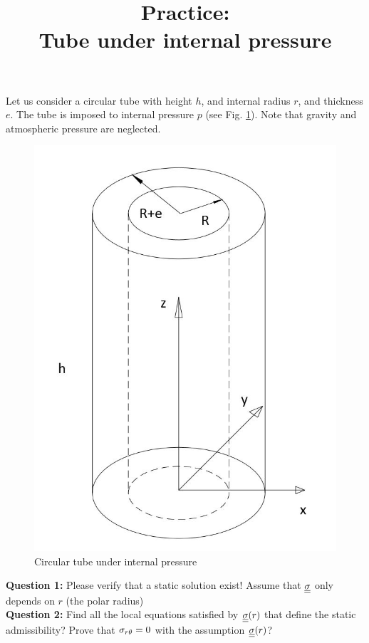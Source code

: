\documentclass[letter,12pt]{article}
\begin{document}
\pagestyle{fancy}

\title{\textbf{Practice: \\ Tube under internal pressure}}
\date{}

\maketitle

\vspace{-1cm}


Let us consider a circular tube with height $h$, and internal radius $r$, and thickness $e$. The tube is imposed to internal pressure $p$ (see Fig. \ref{fig:replacewithrealfigure}). Note that gravity and atmospheric pressure are neglected.

\begin{figure}[ht]
	\centering
	\includegraphics[width=0.5\linewidth]{figures/p1}
	\caption{Circular tube under internal pressure}
	\label{fig:replacewithrealfigure}
\end{figure}



\noindent \textbf{Question 1:} Please verify that a static solution exist! Assume that $\underline{\underline{\sigma}}$ only depends on $r$ (the polar radius)\\

\noindent \textbf{Question 2:} Find all the local equations satisfied by $\underline{\underline{\sigma}}(r)$ that define the static admissibility? Prove that $\sigma_{r\theta} = 0$ with the assumption $\underline{\underline{\sigma}}(r)$?
\end{document}

